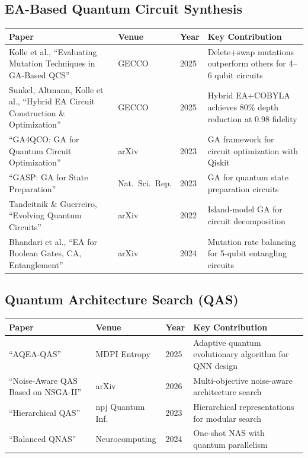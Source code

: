 \documentclass[11pt]{article}
\begin{document}
\subsection{EA-Based Quantum Circuit Synthesis}

\begin{longtable}{p{5.5cm} p{2.5cm} p{1cm} p{5cm}}
\toprule
\textbf{Paper} & \textbf{Venue} & \textbf{Year} & \textbf{Key Contribution} \\
\midrule
\endhead
Kolle et al., ``Evaluating Mutation Techniques in GA-Based QCS'' \cite{kolle2025mutation} & GECCO & 2025 & Delete+swap mutations outperform others for 4--6 qubit circuits \\
\addlinespace
Sunkel, Altmann, Kolle et al., ``Hybrid EA Circuit Construction \& Optimization'' \cite{sunkel2025hybrid} & GECCO & 2025 & Hybrid EA+COBYLA achieves 80\% depth reduction at 0.98 fidelity \\
\addlinespace
``GA4QCO: GA for Quantum Circuit Optimization'' \cite{ga4qco2023} & arXiv & 2023 & GA framework for circuit optimization with Qiskit \\
\addlinespace
``GASP: GA for State Preparation'' \cite{gasp2023} & Nat.\ Sci.\ Rep. & 2023 & GA for quantum state preparation circuits \\
\addlinespace
Tandeitnik \& Guerreiro, ``Evolving Quantum Circuits'' \cite{tandeitnik2022} & arXiv & 2022 & Island-model GA for circuit decomposition \\
\addlinespace
Bhandari et al., ``EA for Boolean Gates, CA, Entanglement'' \cite{bhandari2024} & arXiv & 2024 & Mutation rate balancing for 5-qubit entangling circuits \\
\bottomrule
\end{longtable}

\subsection{Quantum Architecture Search (QAS)}

\begin{longtable}{p{5.5cm} p{3cm} p{1cm} p{4.5cm}}
\toprule
\textbf{Paper} & \textbf{Venue} & \textbf{Year} & \textbf{Key Contribution} \\
\midrule
\endhead
``AQEA-QAS'' \cite{aqea2025} & MDPI Entropy & 2025 & Adaptive quantum evolutionary algorithm for QNN design \\
\addlinespace
``Noise-Aware QAS Based on NSGA-II'' \cite{noiseaware2026} & arXiv & 2026 & Multi-objective noise-aware architecture search \\
\addlinespace
``Hierarchical QAS'' \cite{hierarchical2023} & npj Quantum Inf. & 2023 & Hierarchical representations for modular search \\
\addlinespace
``Balanced QNAS'' \cite{bqnas2024} & Neurocomputing & 2024 & One-shot NAS with quantum parallelism \\
\bottomrule
\end{longtable}
\end{document}
